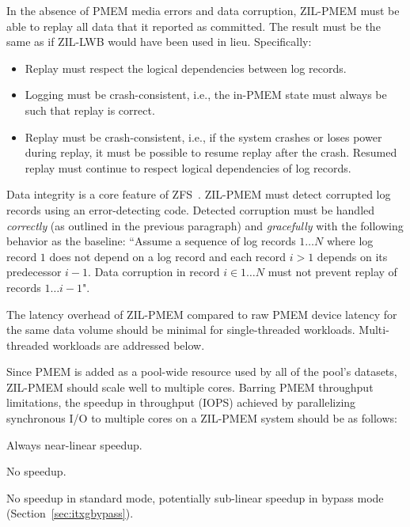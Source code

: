 \documentclass[12pt,a4paper,twoside]{book}
\begin{document}
In the absence of PMEM media errors and data corruption, ZIL-PMEM must be able to replay all data that it reported as committed.
The result must be the same as if ZIL-LWB would have been used in lieu.
Specifically:
\begin{itemize}[noitemsep,beginpenalty=100000,midpenalty=100000]
    \item Replay must respect the logical dependencies between log records.
    \item Logging must be crash-consistent, i.e., the in-PMEM state must always be such that replay is correct.
    \item Replay must be crash-consistent, i.e., if the system crashes or loses power during replay, it must be possible to resume replay after the crash.
        Resumed replay must continue to respect logical dependencies of log records.
\end{itemize}

Data integrity is a core feature of ZFS~\cite{bonwickZettabyteFileSystem2003}.
ZIL-PMEM must detect corrupted log records using an error-detecting code.
Detected corruption must be handled \textit{correctly} (as outlined in the previous paragraph) and \textit{gracefully} with the following behavior as the baseline:
``Assume a sequence of log records $1 \dots N$ where log record $1$ does not depend on a log record and each record $i > 1$ depends on its predecessor $i-1$.
Data corruption in record $i \in 1 \dots N$ must not prevent replay of records $1 \dots i-1$".

The latency overhead of ZIL-PMEM compared to raw PMEM device latency for the same data volume should be minimal for single-threaded workloads.
Multi-threaded workloads are addressed below.

Since PMEM is added as a pool-wide resource used by all of the pool's datasets, ZIL-PMEM should scale well to multiple cores.
Barring PMEM throughput limitations, the speedup in throughput (IOPS) achieved by parallelizing synchronous I/O to multiple cores on a ZIL-PMEM system should be as follows:
{
\setlength{\parskip}{0pt}
\begin{description}[topsep=0pt, noitemsep, leftmargin=1cm, labelindent=1cm, widest=1 private dataset per thread]
    \item[1 private dataset per thread] Always near-linear speedup.
    \item[1 shared dataset] \mbox{}
          \begin{description}[noitemsep, leftmargin=1cm, labelindent=1cm, widest=ZPL filesystem]
              \item[ZPL filesystem] No speedup.
              \item[ZVOL] No speedup in standard mode, potentially sub-linear speedup in bypass mode (Section~\ref{sec:itxgbypass}).
          \end{description}
\end{description}
}
\end{document}
